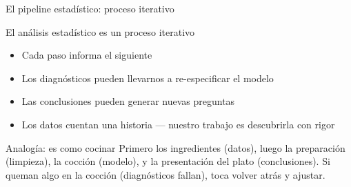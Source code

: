 \documentclass[aspectratio=169, 11pt]{beamer}
\begin{document}
\begin{frame}{El pipeline estadístico: proceso iterativo}
\begin{block}{El an\'alisis estad\'istico es un proceso iterativo}
\begin{itemize}
\item Cada paso informa el siguiente
\item Los diagn\'osticos pueden llevarnos a re-especificar el modelo
\item Las conclusiones pueden generar nuevas preguntas
\item Los datos cuentan una historia --- nuestro trabajo es descubrirla con rigor
\end{itemize}
\end{block}

\begin{exampleblock}{Analog\'ia: es como cocinar}
\small
Primero los ingredientes (datos), luego la preparaci\'on (limpieza), la cocci\'on (modelo), y la presentaci\'on del plato (conclusiones). Si queman algo en la cocci\'on (diagn\'osticos fallan), toca volver atr\'as y ajustar.
\end{exampleblock}
\end{frame}
\end{document}
